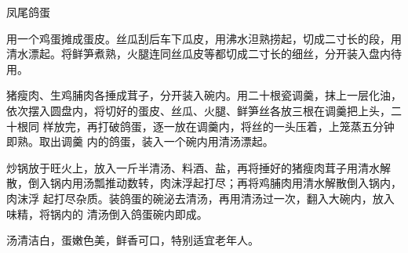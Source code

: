 %
%
%
%
%
%
%
\begin{recipe}{凤尾鸽蛋}

\ingredients


\preparation

\step 用一个鸡蛋摊成蛋皮。丝瓜刮后车下瓜皮，用沸水泹熟捞起，切成二寸长的段，用
清水漂起。将鲜笋煮熟，火腿连同丝瓜皮等都切成二寸长的细丝，分开装入盘内待用。

\step 猪瘦肉、生鸡脯肉各捶成茸子，分开装入碗内。用二十根瓷调羹，抹上一层化油，
依次摆入圆盘内，将切好的蛋皮、丝瓜、火腿、鲜笋丝各放三根在调羹把上头，二十根同
样放完，再打破鸽蛋，逐一放在调羹内，将丝的一头压着，上笼蒸五分钟即熟。取出调羹
内的鸽蛋，装入一个碗内用清汤漂起。

\step 炒锅放于旺火上，放入一斤半清汤、料酒、盐，再将捶好的猪瘦肉茸子用清水解
散，倒入锅内用汤瓢推动数转，肉沫浮起打尽；再将鸡脯肉用清水解散倒入锅内，肉沫浮
起打尽杂质。装鸽蛋的碗泌去清汤，再用清汤过一次，翻入大碗内，放入味精，将锅内的
清汤倒入鸽蛋碗内即成。

\features

汤清洁白，蛋嫩色美，鲜香可口，特别适宜老年人。

\end{recipe}

